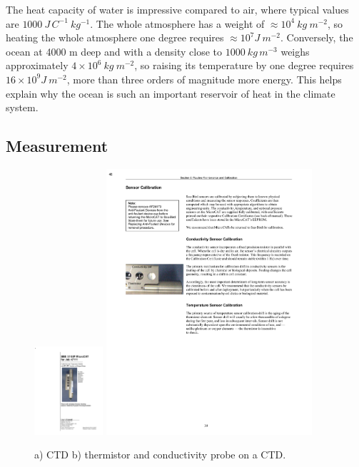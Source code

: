 The heat capacity of water is impressive compared to air, where typical values are $1000\ J\, C^{-1}\ kg^{-1}$.  The whole atmosphere has a weight of $\approx 10^{4} \ kg\ m^{-2}$, so heating the whole atmosphere one degree requires $\approx 10^7 J\ m^{-2}$.  Conversely, the ocean at 4000 m deep and with a density close to $1000 \ kg\,m^{-3}$ weighs approximately $4\times10^6\ kg\ m^{-2}$, so raising its temperature by one degree requires $16\times10^9 J\ m^{-2}$, more than three orders of magnitude more energy.  This helps explain why the ocean is such an important reservoir of heat in the climate system.  

\subsection{Measurement}

\begin{figure}[hbtp]
  \begin{center}
    \includegraphics[width=1in]{figs/CTD.pdf}
    \includegraphics[width=3in]{figs/ThermistorConductity.pdf}
    \caption{a) CTD b) thermistor and conductivity probe on a CTD.}
    \label{fig:CTD}  
  \end{center}
\end{figure}

